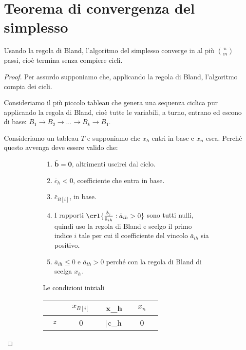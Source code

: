 \documentclass[\main/main.tex]{subfiles}
\begin{document}
\section{Teorema di convergenza del simplesso}
\begin{theorem}
  Usando la regola di Bland, l'algoritmo del simplesso converge in al più $\binom{n}{m}$ passi, cioè termina senza compiere cicli.
\end{theorem}

\begin{proof}
  Per assurdo supponiamo che, applicando la regola di Bland, l'algoritmo compia dei cicli.

  Consideriamo il più piccolo tableau che genera una sequenza ciclica pur applicando la regola di Bland, cioè tutte le variabili, a turno, entrano ed escono di base: $B_1 \rightarrow B_2 \rightarrow \ldots \rightarrow B_k \rightarrow B_1$.

  Consideriamo un tableau $T$ e supponiamo che $x_h$ entri in base e $x_n$ esca. Perché questo avvenga deve essere valido che:

  \begin{figure}
    \begin{subfigure}{0.49\textwidth}
      \begin{enumerate}
        \item $\bar{\bm{b}} = \bm{0}$, altrimenti uscirei dal ciclo.
        \item $\bar{c}_h < 0$, coefficiente che entra in base.
        \item $\bar{c}_{B[i]}$, in base.
        \item I rapporti $\crl{\frac{\bar{b}_j}{\bar{a}_{ih}}:\bar{a}_{ih}>0}$ sono tutti nulli, quindi uso la regola di Bland e scelgo il primo indice $i$ tale per cui il coefficiente del vincolo $\bar{a}_{ih}$ sia positivo.
        \item $\bar{a}_{ih} \leq 0$ e  $\bar{a}_{th} > 0$ perché con la regola di Bland di scelga $x_h$.
      \end{enumerate}
      \caption{Le condizioni iniziali}
    \end{subfigure}
    \begin{subfigure}{0.49\textwidth}
      \begin{table}
        \begin{tabular}{c|LcLLLc|L}
                       &  & $x_{B[i]}$ &  & x_h          &  & $x_n$ &   \\
          \hline
          $-z$         &  & 0          &  & \bar{c}_h    &  & 0     &   \\
          \hline


\end{tabular}
\end{table}
\end{subfigure}
\end{figure}
\end{proof}
\end{document}

